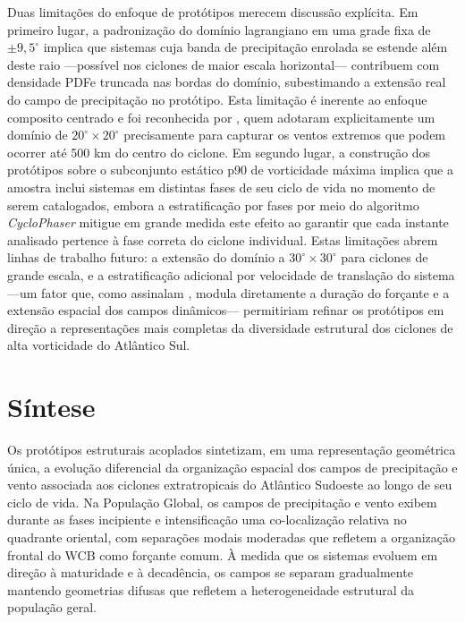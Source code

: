 Duas limitações do enfoque de protótipos merecem discussão explícita. Em primeiro lugar, a padronização do domínio lagrangiano em uma grade fixa de $\pm 9{,}5^{\circ}$ implica que sistemas cuja banda de precipitação enrolada se estende além deste raio —possível nos ciclones de maior escala horizontal— contribuem com densidade PDFe truncada nas bordas do domínio, subestimando a extensão real do campo de precipitação no protótipo. Esta limitação é inerente ao enfoque composito centrado e foi reconhecida por \citet{cardoso2022synoptic}, quem adotaram explicitamente um domínio de $20^{\circ} \times 20^{\circ}$ precisamente para capturar os ventos extremos que podem ocorrer até 500 km do centro do ciclone. Em segundo lugar, a construção dos protótipos sobre o subconjunto estático p90 de vorticidade máxima implica que a amostra inclui sistemas em distintas fases de seu ciclo de vida no momento de serem catalogados, embora a estratificação por fases por meio do algoritmo \textit{CycloPhaser} \citep{deSouza2025CycloPhaser} mitigue em grande medida este efeito ao garantir que cada instante analisado pertence à fase correta do ciclone individual. Estas limitações abrem linhas de trabalho futuro: a extensão do domínio a $30^{\circ} \times 30^{\circ}$ para ciclones de grande escala, e a estratificação adicional por velocidade de translação do sistema —um fator que, como assinalam \citet{gramcianinov2023impact}, modula diretamente a duração do forçante e a extensão espacial dos campos dinâmicos— permitiriam refinar os protótipos em direção a representações mais completas da diversidade estrutural dos ciclones de alta vorticidade do Atlântico Sul.

\section{Síntese}\label{sec:sintesis_prototipos}

Os protótipos estruturais acoplados sintetizam, em uma representação geométrica única, a evolução diferencial da organização espacial dos campos de precipitação e vento associada aos ciclones extratropicais do Atlântico Sudoeste ao longo de seu ciclo de vida. Na População Global, os campos de precipitação e vento exibem durante as fases incipiente e intensificação uma co-localização relativa no quadrante oriental, com separações modais moderadas que refletem a organização frontal do WCB como forçante comum. À medida que os sistemas evoluem em direção à maturidade e à decadência, os campos se separam gradualmente mantendo geometrias difusas que refletem a heterogeneidade estrutural da população geral.

